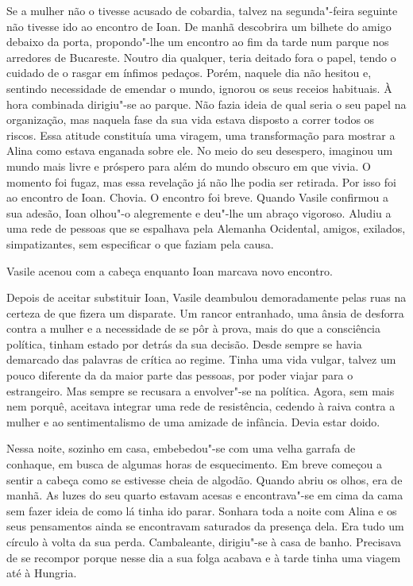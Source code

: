 Se a mulher não o tivesse acusado de cobardia, talvez na segunda"-feira
seguinte não tivesse ido ao encontro de Ioan. De manhã descobrira um
bilhete do amigo debaixo da porta, propondo"-lhe um encontro ao fim da
tarde num parque nos arredores de Bucareste. Noutro dia qualquer, teria
deitado fora o papel, tendo o cuidado de o rasgar em ínfimos pedaços.
Porém, naquele dia não hesitou e, sentindo necessidade de emendar o
mundo, ignorou os seus receios habituais. À hora combinada dirigiu"-se ao
parque. Não fazia ideia de qual seria o seu papel na organização,
mas naquela fase da sua vida estava disposto a correr todos os riscos.
Essa atitude constituía uma viragem, uma transformação para mostrar a
Alina como estava enganada sobre ele. No meio do seu desespero,
imaginou um mundo mais livre e próspero para além do mundo obscuro em
que vivia. O momento foi fugaz, mas essa revelação já não lhe podia ser
retirada. Por isso foi ao encontro de Ioan. Chovia. O encontro foi
breve. Quando Vasile confirmou a sua adesão, Ioan olhou"-o alegremente
e deu"-lhe um abraço vigoroso. Aludiu a uma rede de pessoas que se
espalhava pela Alemanha Ocidental, amigos, exilados, simpatizantes, sem
especificar o que faziam pela causa.

Vasile acenou com a cabeça enquanto Ioan marcava novo encontro.

Depois de aceitar substituir Ioan, Vasile deambulou demoradamente pelas
ruas na certeza de que fizera um disparate. Um rancor entranhado, uma
ânsia de desforra contra a mulher e a necessidade de se pôr à prova,
mais do que a consciência política, tinham estado por detrás da sua
decisão. Desde sempre se havia demarcado das palavras de crítica ao
regime. Tinha uma vida vulgar, talvez um pouco diferente da da maior
parte das pessoas, por poder viajar para o estrangeiro. Mas sempre se
recusara a envolver"-se na política. Agora, sem mais nem porquê, aceitava
integrar uma rede de resistência, cedendo à raiva contra a mulher e ao
sentimentalismo de uma amizade de infância. Devia estar doido.

Nessa noite, sozinho em casa, embebedou"-se com uma velha garrafa de
conhaque, em busca de algumas horas de esquecimento. Em breve começou a
sentir a cabeça como
se estivesse cheia de algodão. Quando abriu os olhos, era de manhã. As
luzes do seu quarto estavam acesas e encontrava"-se em cima da cama sem
fazer ideia de como lá tinha ido parar. Sonhara toda a noite com Alina e
os seus pensamentos ainda se encontravam saturados da presença dela. Era
tudo um círculo à volta da sua perda. Cambaleante, dirigiu"-se à casa
de banho. Precisava de se recompor porque nesse dia a sua folga
acabava e à tarde tinha uma viagem até à Hungria.

